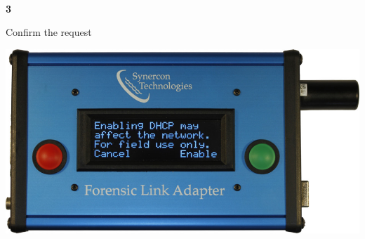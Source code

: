 \documentclass[11pt, oneside]{book}
\begin{document}
\\[\baselineskip]
\noindent\begin{minipage}{0.45\textwidth}%
\begin{center}
\textbf{3}\\[\baselineskip]
\end{center}
Confirm the request
\end{minipage}%
\hfill%
\begin{minipage}{0.45\textwidth}
\includegraphics[width=\linewidth]{../media/fla_screens/ethernet_and_others/sys_conf/dhcp_enabling}
\end{minipage}
\end{document}
